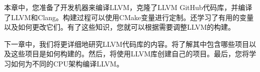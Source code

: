 本章中，您准备了开发机器来编译LLVM，克隆了LLVM GitHub代码库，并编译了LLVM和Clang。构建过程可以使用CMake变量进行定制。还学习了有用的变量以及如何更改它们。有了这些知识，您就可以根据需要调整LLVM的构建。\par

下一章中，我们将更详细地研究LLVM代码库的内容。将了解其中包含哪些项目以及这些项目是如何构建的。然后，将使用LLVM库创建自己的项目。最后，您将学习如何为不同的CPU架构编译LLVM。\par

\newpage